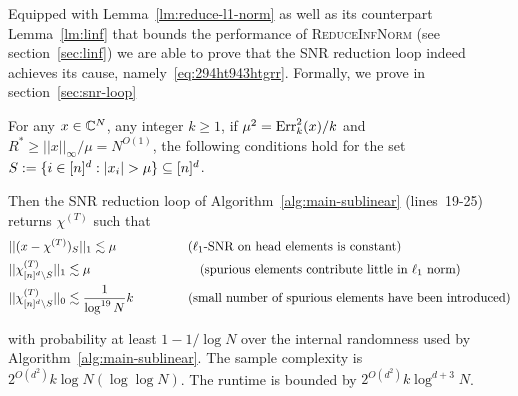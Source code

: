 Equipped with Lemma~\ref{lm:reduce-l1-norm} as well as its counterpart Lemma~\ref{lm:linf} that bounds the performance of \textsc{ReduceInfNorm} (see section~\ref{sec:linf}) we are able to prove that the SNR reduction loop indeed achieves its cause, namely~\eqref{eq:294ht943htgrr}. Formally, we prove in section~\ref{sec:snr-loop}
\begin{theorem}\label{thm:l1snr}
For any $x\in \mathbb{C}^N$, any integer $k\geq 1$, if $\mu^2=\operatorname{Err}_k^2(x)/k$ and $R^*\geq ||x||_\infty/\mu=N^{O(1)}$, the following conditions hold for the set $S:=\{i\in \nsq: |x_i|>\mu\}\subseteq \nsq$.

Then the SNR reduction loop of Algorithm~\ref{alg:main-sublinear} (lines~19-25) returns $\chi^{(T)}$ such that 
\begin{equation*}
\begin{split}
&||(x-\chi^{(T)})_S||_1\lesssim \mu\text{~~~~~~~~~~~~~~~~~($\ell_1$-SNR on head elements is constant)}\\
&||\chi^{(T)}_{{[n]^d}\setminus S}||_1\lesssim \mu \text{~~~~~~~~~~~~~~~~~~~~~~~~~~(spurious elements contribute little in $\ell_1$ norm)}\\
&||\chi^{(T)}_{{[n]^d}\setminus S}||_0\lesssim \frac1{\log^{19} N} k\text{~~~~~~~~~~~~~(small number of spurious elements have been introduced)}
\end{split}
\end{equation*}

with probability at least $1-1/\log N$ over the internal randomness used by Algorithm~\ref{alg:main-sublinear}. The sample complexity is $2^{O(d^2)}k\log N(\log\log N)$. The runtime is bounded by $2^{O(d^2)} k \log^{d+3} N$.
\end{theorem}



